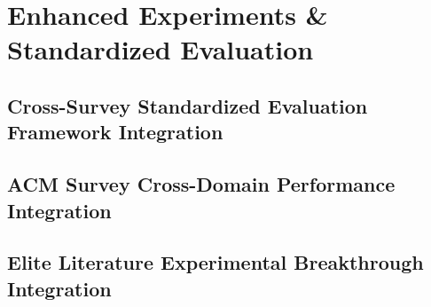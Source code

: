 \documentclass[journal]{IEEEtran}
\begin{document}
%
%
%

\section{Enhanced Experiments \& Standardized Evaluation}
\label{sec:experiments}


\subsection{Cross-Survey Standardized Evaluation Framework Integration}

\subsection{ACM Survey Cross-Domain Performance Integration}

\subsection{Elite Literature Experimental Breakthrough Integration}
\end{document}
